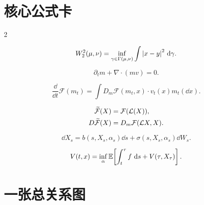 \section{核心公式卡}

\begin{multicols}{2}
\begin{definition}[最优搬运]
\[
W_2^2(\mu,\nu)=
\inf_{\gamma\in\Gamma(\mu,\nu)}
\int\left\lvert x-y\right\rvert^2\,\mathrm{d}\gamma.
\]
\end{definition}

\begin{definition}[连续性方程]
\[
\partial_tm+\nabla\cdot(mv)=0.
\]
\end{definition}

\begin{definition}[分布链式法则]
\[
\frac{\dd}{\dd t}\mathcal F(m_t)
=\int D_m\mathcal F(m_t,x)\cdot v_t(x)m_t(\dd x).
\]
\end{definition}

\begin{definition}[Hilbert 提升]
\[
\begin{aligned}
\widetilde{\mathcal F}(X)&=\mathcal F(\mathcal{L}(X)),\\
D\widetilde{\mathcal F}(X)&=D_m\mathcal F(\mathcal{L} X,X).
\end{aligned}
\]
\end{definition}

\begin{definition}[受控扩散]
\[
\dd X_s=b(s,X_s,\alpha_s)\dd s
+\sigma(s,X_s,\alpha_s)\dd W_s.
\]
\end{definition}

\begin{definition}[动态规划]
\[
V(t,x)=\inf_\alpha\mathbb{E}\!\left[
\int_t^\tau f\,\,\mathrm{d} s+V(\tau,X_\tau)\right].
\]
\end{definition}
\end{multicols}

\section{一张总关系图}

